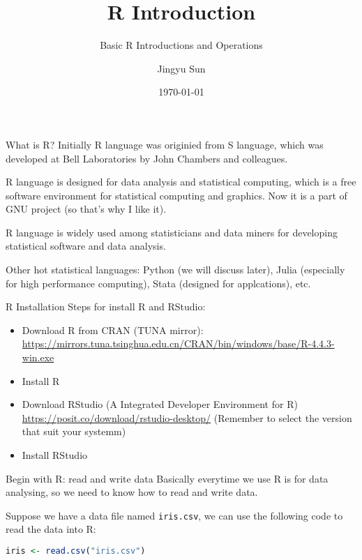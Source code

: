 \documentclass[aspectratio=169]{beamer}
\title{R Introduction}
\subtitle{Basic R Introductions and Operations}
\date{\today}
\author{Jingyu Sun}
\institute{\small \emph{Ocean University of China, High Performance Computing Club, Qingdao 266100}}
\begin{document}
    \begin{frame}
        \titlepage
    \end{frame}

    \begin{frame}{What is R?}
        Initially R language was originied from S language, which was developed at Bell Laboratories by John Chambers and colleagues.\par
        R language is designed for data analysis and statistical computing, which is a free software environment for statistical computing and graphics. Now it is a part of GNU project (so that's why I like it).\par
        R language is widely used among statisticians and data miners for developing statistical software and data analysis.\par
        Other hot statistical languages: Python (we will discuss later), Julia (especially for high performance computing), Stata (designed for applcations), etc.\par
    \end{frame}

    \begin{frame}{R Installation}
        Steps for install R and RStudio:
        \begin{itemize}
            \item Download R from CRAN (TUNA mirror): \url{https://mirrors.tuna.tsinghua.edu.cn/CRAN/bin/windows/base/R-4.4.3-win.exe}
            \item Install R
            \item Download RStudio (A Integrated Developer Environment for R) \url{https://posit.co/download/rstudio-desktop/} (Remember to select the version that suit your systemm)
            \item Install RStudio
        \end{itemize}
    \end{frame}

    \begin{frame}[fragile]{Begin with R: read and write data}
        Basically everytime we use R is for data analysing, so we need to know how to read and write data.\par
        Suppose we have a data file named \texttt{iris.csv}, we can use the following code to read the data into R:\par
        \begin{lstlisting}[language=R]
        iris <- read.csv("iris.csv")
        \end{lstlisting}
    \end{frame}
\end{document}

